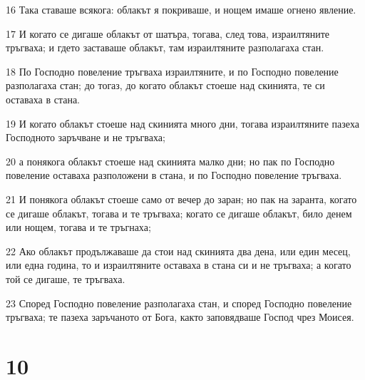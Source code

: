 \par 16 Така ставаше всякога: облакът я покриваше, и нощем имаше огнено явление.
\par 17 И когато се дигаше облакът от шатъра, тогава, след това, израилтяните тръгваха; и гдето заставаше облакът, там израилтяните разполагаха стан.
\par 18 По Господно повеление тръгваха израилтяните, и по Господно повеление разполагаха стан; до тогаз, до когато облакът стоеше над скинията, те си оставаха в стана.
\par 19 И когато облакът стоеше над скинията много дни, тогава израилтяните пазеха Господното заръчване и не тръгваха;
\par 20 а понякога облакът стоеше над скинията малко дни; но пак по Господно повеление оставаха разположени в стана, и по Господно повеление тръгваха.
\par 21 И понякога облакът стоеше само от вечер до заран; но пак на заранта, когато се дигаше облакът, тогава и те тръгваха; когато се дигаше облакът, било денем или нощем, тогава и те тръгнаха;
\par 22 Ако облакът продължаваше да стои над скинията два дена, или един месец, или една година, то и израилтяните оставаха в стана си и не тръгваха; а когато той се дигаше, те тръгваха.
\par 23 Според Господно повеление разполагаха стан, и според Господно повеление тръгваха; те пазеха заръчаното от Бога, както заповядваше Господ чрез Моисея.

\chapter{10}

